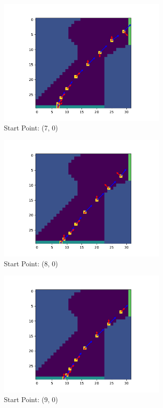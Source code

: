 \documentclass{article}
\begin{document}
\begin{figure}[H]
	\centering
	\includegraphics[width=0.75\textwidth]{../figure/fig_7}
	\caption{Start Point: (7, 0)}
	\label{fig:fig_7}
\end{figure}


\begin{figure}[H]
	\centering
	\includegraphics[width=0.75\textwidth]{../figure/fig_8}
	\caption{Start Point: (8, 0)}
	\label{fig:fig_8}
\end{figure}


\begin{figure}[H]
	\centering
	\includegraphics[width=0.75\textwidth]{../figure/fig_9}
	\caption{Start Point: (9, 0)}
	\label{fig:fig_9}
\end{figure}
\end{document}
